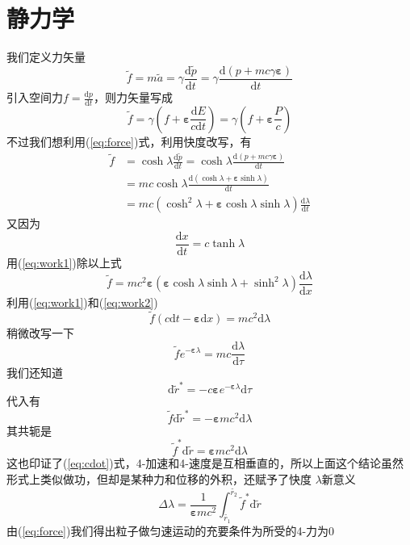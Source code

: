 \documentclass[hyperref,utf8]{ctexart}
\newcommand{\e}{\boldsymbol{\varepsilon}}
\begin{document}
\section{静力学}
我们定义力矢量
\begin{equation}
    \tilde{f}=m\tilde{a}=\gamma\frac{\mathrm{d}\tilde{p}}{\mathrm{d}t}=\gamma\frac{\mathrm{d}(p+mc\gamma{\boldsymbol{\varepsilon}})}{\mathrm{d}t} \label{eq:force}
\end{equation}
引入空间力$f=\frac{\mathrm{d}p}{\mathrm{d}t}$，则力矢量写成\[\tilde{f}=\gamma(f+{\boldsymbol{\varepsilon}}\frac{\mathrm{d}E}{c\mathrm{d}t})=\gamma(f+{\boldsymbol{\varepsilon}}\frac{P}{c})\]
不过我们想利用(\ref{eq:force})式，利用快度改写，有
\begin{align}
    \tilde{f}&=\cosh \lambda \frac{\mathrm{d}\tilde{p}}{\mathrm{d}t}=\cosh \lambda \frac{\mathrm{d}(p+mc\gamma{\boldsymbol{\varepsilon}})}{\mathrm{d}t} \nonumber \\ 
    &=mc\cosh \lambda\frac{\mathrm{d}(\cosh{\lambda}+\e \sinh{\lambda})}{\mathrm{d}t} \nonumber \\
    &=mc (\cosh^2 \lambda  +\e  \cosh \lambda \sinh \lambda  )\frac{\mathrm{d}\lambda }{\mathrm{d}t}\label{eq:work1}
\end{align}
又因为
\[\frac{\mathrm{d}x}{\mathrm{d}t}=c\tanh \lambda \]
用(\ref{eq:work1})除以上式
\begin{equation}
    \tilde{f}=mc^2\e (\e \cosh \lambda  \sinh \lambda +  \sinh^2 \lambda  )\frac{\mathrm{d}\lambda }{\mathrm{d}x}\label{eq:work2}
\end{equation}
利用(\ref{eq:work1})和(\ref{eq:work2})
\begin{equation*}
    \tilde{f}(c\mathrm{d}t-\e \mathrm{d}x)=mc^2\mathrm{d}\lambda 
\end{equation*}
稍微改写一下
\begin{equation}
    \tilde{f}e^{-\e \lambda }=mc\frac{\mathrm{d}\lambda }{ \mathrm{d}\tau}
\end{equation}
我们还知道
\[\mathrm{d}\tilde{r}^*=-c\e e^{-\e \lambda }\mathrm{d}\tau\]
代入有
\[\tilde{f}\mathrm{d}\tilde{r}^*=-\e mc^2\mathrm{d}\lambda \]
其共轭是
\[\tilde{f}^*\mathrm{d}\tilde{r}=\e mc^2\mathrm{d}\lambda \]
这也印证了(\ref{eq:cdot})式，4-加速和4-速度是互相垂直的，所以上面这个结论虽然形式上类似做功，但却是某种力和位移的外积，还赋予了快度 $\lambda $新意义
\[\Delta \lambda=\frac{1}{\e mc^2}\int^{\tilde{r_2}}_{\tilde{r_1}} \tilde{f}^*\mathrm{d}\tilde{r}\] 
由(\ref{eq:force})我们得出粒子做匀速运动的充要条件为所受的4-力为0
\end{document}
